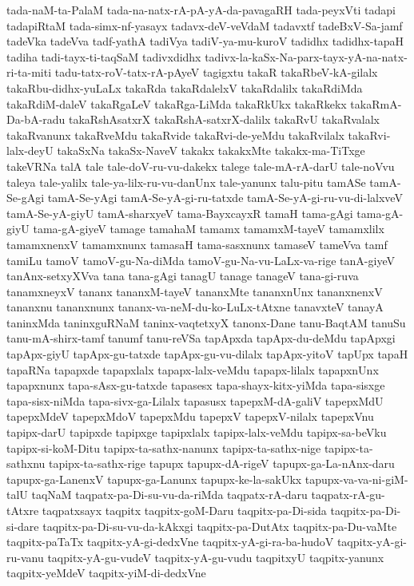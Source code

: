 {tada-naM-ta-PalaM
tada-na-natx-rA-pA-yA-da-pavagaRH
tada-peyxVti
tadapi
tadapiRtaM
tada-simx-nf-yasayx
tadavx-deV-veVdaM
tadavxtf
tadeBxV-Sa-jamf
tadeVka
tadeVva
tadf-yathA
tadiVya
tadiV-ya-mu-kuroV
tadidhx
tadidhx-tapaH
tadiha
tadi-tayx-ti-taqSaM
tadivxdidhx
tadivx-la-kaSx-Na-parx-tayx-yA-na-natx-ri-ta-miti
tadu-tatx-roV-tatx-rA-pAyeV
tagigxtu
takaR
takaRbeV-kA-gilalx
takaRbu-didhx-yuLaLx
takaRda
takaRdalelxV
takaRdalilx
takaRdiMda
takaRdiM-daleV
takaRgaLeV
takaRga-LiMda
takaRkUkx
takaRkekx
takaRmA-Da-bA-radu
takaRshAsatxrX
takaRshA-satxrX-dalilx
takaRvU
takaRvalalx
takaRvanunx
takaRveMdu
takaRvide
takaRvi-de-yeMdu
takaRvilalx
takaRvi-lalx-deyU
takaSxNa
takaSx-NaveV
takakx
takakxMte
takakx-ma-TiTxge
takeVRNa
talA
tale
tale-doV-ru-vu-dakekx
talege
tale-mA-rA-darU
tale-noVvu
taleya
tale-yalilx
tale-ya-lilx-ru-vu-danUnx
tale-yanunx
talu-pitu
tamASe
tamA-Se-gAgi
tamA-Se-yAgi
tamA-Se-yA-gi-ru-tatxde
tamA-Se-yA-gi-ru-vu-di-lalxveV
tamA-Se-yA-giyU
tamA-sharxyeV
tama-BayxcayxR
tamaH
tama-gAgi
tama-gA-giyU
tama-gA-giyeV
tamage
tamahaM
tamamx
tamamxM-tayeV
tamamxlilx
tamamxnenxV
tamamxnunx
tamasaH
tama-sasxnunx
tamaseV
tameVva
tamf
tamiLu
tamoV
tamoV-gu-Na-diMda
tamoV-gu-Na-vu-LaLx-va-rige
tanA-giyeV
tanAnx-setxyXVva
tana
tana-gAgi
tanagU
tanage
tanageV
tana-gi-ruva
tanamxneyxV
tananx
tananxM-tayeV
tananxMte
tananxnUnx
tananxnenxV
tananxnu
tananxnunx
tananx-va-neM-du-ko-LuLx-tAtxne
tanavxteV
tanayA
taninxMda
taninxguRNaM
taninx-vaqtetxyX
tanonx-Dane
tanu-BaqtAM
tanuSu
tanu-mA-shirx-tamf
tanumf
tanu-reVSa
tapApxda
tapApx-du-deMdu
tapApxgi
tapApx-giyU
tapApx-gu-tatxde
tapApx-gu-vu-dilalx
tapApx-yitoV
tapUpx
tapaH
tapaRNa
tapapxde
tapapxlalx
tapapx-lalx-veMdu
tapapx-lilalx
tapapxnUnx
tapapxnunx
tapa-sAsx-gu-tatxde
tapasesx
tapa-shayx-kitx-yiMda
tapa-sisxge
tapa-sisx-niMda
tapa-sivx-ga-Lilalx
tapasusx
tapepxM-dA-galiV
tapepxMdU
tapepxMdeV
tapepxMdoV
tapepxMdu
tapepxV
tapepxV-nilalx
tapepxVnu
tapipx-darU
tapipxde
tapipxge
tapipxlalx
tapipx-lalx-veMdu
tapipx-sa-beVku
tapipx-si-koM-Ditu
tapipx-ta-sathx-nanunx
tapipx-ta-sathx-nige
tapipx-ta-sathxnu
tapipx-ta-sathx-rige
tapupx
tapupx-dA-rigeV
tapupx-ga-La-nAnx-daru
tapupx-ga-LanenxV
tapupx-ga-Lanunx
tapupx-ke-la-sakUkx
tapupx-va-va-ni-giM-talU
taqNaM
taqpatx-pa-Di-su-vu-da-riMda
taqpatx-rA-daru
taqpatx-rA-gu-tAtxre
taqpatxsayx
taqpitx
taqpitx-goM-Daru
taqpitx-pa-Di-sida
taqpitx-pa-Di-si-dare
taqpitx-pa-Di-su-vu-da-kAkxgi
taqpitx-pa-DutAtx
taqpitx-pa-Du-vaMte
taqpitx-paTaTx
taqpitx-yA-gi-dedxVne
taqpitx-yA-gi-ra-ba-hudoV
taqpitx-yA-gi-ru-vanu
taqpitx-yA-gu-vudeV
taqpitx-yA-gu-vudu
taqpitxyU
taqpitx-yanunx
taqpitx-yeMdeV
taqpitx-yiM-di-dedxVne
}
